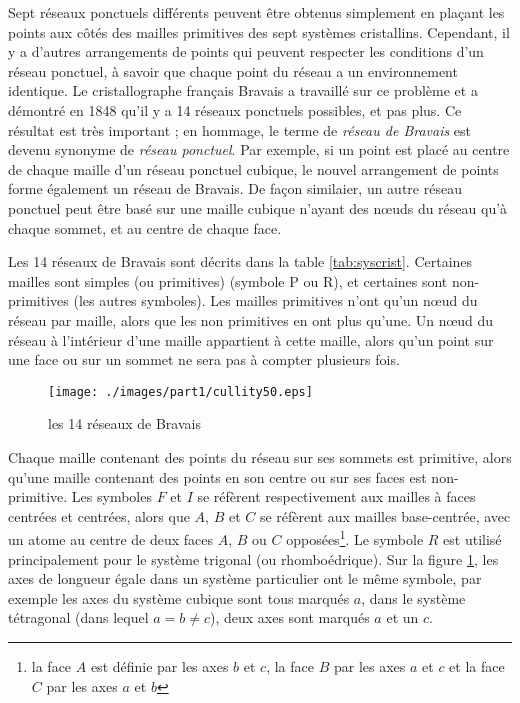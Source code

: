 Sept réseaux ponctuels différents peuvent être obtenus simplement en plaçant les
points aux côtés des mailles primitives des sept systèmes cristallins. Cependant,
il y a d'autres arrangements de points qui peuvent respecter les conditions d'un
réseau ponctuel, à savoir que chaque point du réseau a un environnement
identique. Le cristallographe français Bravais a travaillé sur ce problème et a
démontré en 1848 qu'il y a 14 réseaux ponctuels possibles, et pas plus. Ce
résultat est très important ; en hommage, le terme de \emph{réseau de Bravais}
est devenu synonyme de \emph{réseau ponctuel}. Par exemple, si un point est placé
au centre de chaque maille d'un réseau ponctuel cubique, le nouvel arrangement de
points forme également un réseau de Bravais. De façon similaier, un autre réseau
ponctuel peut être basé sur une maille cubique n'ayant des nœuds du réseau qu'à
chaque sommet, et au centre de chaque face.

Les 14 réseaux de Bravais sont décrits dans la table \ref{tab:syscrist}.
Certaines mailles sont simples (ou primitives) (symbole P ou R), et certaines
sont non-primitives (les autres symboles). Les mailles primitives n'ont qu'un
nœud du réseau par maille, alors que les non primitives en ont plus qu'une. Un
nœud du réseau à l'intérieur d'une maille appartient à cette maille, alors qu'un
point sur une face ou sur un sommet ne sera pas à compter plusieurs fois.

\begin{figure}
    \texttt{[image: ./images/part1/cullity50.eps]}
    \caption{les 14 réseaux de Bravais}
    \label{fig:bravaisschema}
\end{figure}

Chaque maille contenant des points du réseau sur ses sommets est primitive, alors
qu'une maille contenant des points en son centre ou sur ses faces est
non-primitive. Les symboles $F$ et $I$ se réfèrent respectivement aux mailles à
faces centrées et centrées, alors que $A$, $B$ et $C$ se réfèrent aux mailles
base-centrée, avec un atome au centre de deux faces $A$, $B$ ou $C$
opposées\footnote{la face $A$ est définie par les axes $b$ et $c$, la face $B$
par les axes $a$ et $c$ et la face $C$ par les axes $a$ et $b$}. Le symbole $R$
est utilisé principalement pour le système trigonal (ou rhomboédrique). Sur la
figure \ref{fig:bravaisschema}, les axes de longueur égale dans un système
particulier ont le même symbole, par exemple les axes du système cubique sont
tous marqués $a$, dans le système tétragonal (dans lequel $a = b \neq c$), deux
axes sont marqués $a$ et un $c$.

